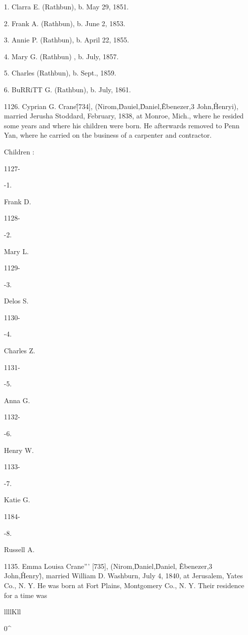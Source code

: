 1. Clarra E. (Rathbun), b. May 29, 1851. 

2. Frank A. (Rathbun), b. June 2, 1853. 

3. Annie P. (Rathbun), b. April 22, 1855. 

4. Mary G. (Rathbun) , b. July, 1857. 

5. Charles (Rathbun), b. Sept., 1859. 

6. BuRRiTT G. (Rathbun), b. July, 1861. 

1126. Cyprian G. Crane\^ [734], (Nirom,\^ Dauiel,\^ Daniel,\^ 
Ebenezer,3 John,\^ Henryi), married Jerusha Stoddard, February, 
1838, at Monroe, Mich., where he resided some years and where 
his children were born. He afterwards removed to Penn Yan, 
where he carried on the business of a carpenter and contractor. 

Children : 



1127- 


-1. 


Frank D. 


1128- 


-2. 


Mary L. 


1129- 


-3. 


Delos S. 


1130- 


-4. 


Charles Z. 


1131- 


-5. 


Anna G. 


1132- 


-6. 


Henry W. 


1133- 


-7. 


Katie G. 


1184- 


-8. 


Russell A. 



1135. Emma Louisa Crane''' [735], (Nirom,\^ Daniel,\^ Daniel, \^ 
Ebenezer,3 John,\^ Henry\^), married William D. Washburn, July 
4, 1840, at Jerusalem, Yates Co., N. Y. He was born at Fort 
Plains, Montgomery Co., N. Y. Their residence for a time was 



llllKll 



0\^ 





